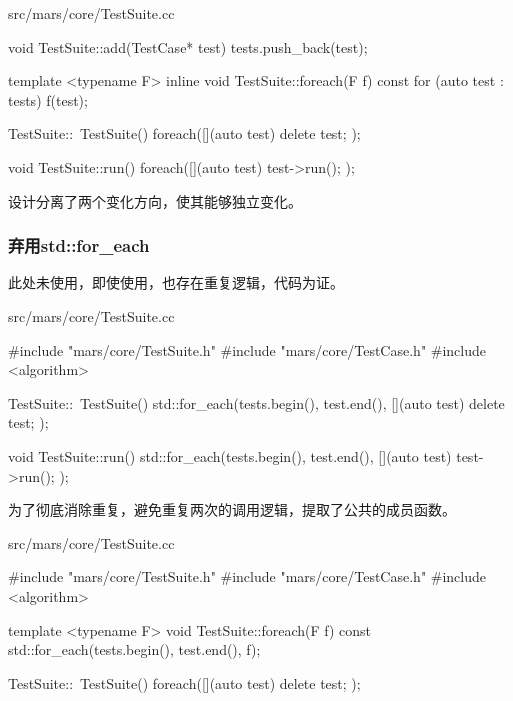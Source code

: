 \begin{content}
\begin{diff}{src/mars/core/TestSuite.cc}
\begin{minicpp}
void TestSuite::add(TestCase* test) {
  tests.push_back(test);
}

template <typename F>
inline void TestSuite::foreach(F f) const {
  for (auto test : tests) {
    f(test);
  }
}

TestSuite::~TestSuite() {
  foreach([](auto test) {
    delete test;
  });
}

void TestSuite::run() {
  foreach([](auto test) {
    test->run();
  });
}
 \end{minicpp}
\end{diff}

设计分离了两个变化方向，使其能够独立变化。

\begin{enum}
\end{enum}

\subsubsection{弃用std::for\_each}

此处未使用，即使使用，也存在重复逻辑，代码为证。

\begin{nodiff}{src/mars/core/TestSuite.cc}
 \begin{c++}
#include "mars/core/TestSuite.h"
#include "mars/core/TestCase.h"
#include <algorithm>

TestSuite::~TestSuite() {
  std::for_each(tests.begin(), test.end(), [](auto test){
    delete test;
  });
}

void TestSuite::run() {
  std::for_each(tests.begin(), test.end(), [](auto test){
    test->run();
  });
}
 \end{c++}
\end{nodiff}

为了彻底消除重复，避免重复两次的调用逻辑，提取了公共的成员函数。

\begin{nodiff}{src/mars/core/TestSuite.cc}
 \begin{c++}
#include "mars/core/TestSuite.h"
#include "mars/core/TestCase.h"
#include <algorithm>

template <typename F>
void TestSuite::foreach(F f) const {
  std::for_each(tests.begin(), test.end(), f);
}

TestSuite::~TestSuite() {
  foreach([](auto test){
    delete test;
  });
}


\end{c++}
\end{nodiff}
\end{content}
